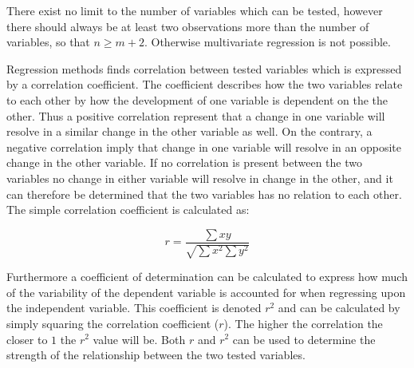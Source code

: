 There exist no limit to the number of variables which can be tested, however there should always be at least two observations more than the number of variables, so that $n \geq m+2$. Otherwise multivariate regression is not possible. \cite{zar2009}

Regression methods finds correlation between tested variables which is expressed by a correlation coefficient. The coefficient describes how the two variables relate to each other by how the development of one variable is dependent on the the other. Thus a positive correlation represent that a change in one variable will resolve in a similar change in the other variable as well. On the contrary, a negative correlation imply that change in one variable will resolve in an opposite change in the other variable. If no correlation is present between the two variables no change in either variable will resolve in change in the other, and it can therefore be determined that the two variables has no relation to each other. \cite{zar2009}
The simple correlation coefficient is calculated as: \cite{zar2009}

\begin{equation}
r = \frac{\sum xy}{\sqrt{\sum x^{2} \sum y^{2}}}
\end{equation}

Furthermore a coefficient of determination can be calculated to express how much of the variability of the dependent variable is accounted for when regressing upon the independent variable. This coefficient is denoted $r^{2}$ and can be calculated by simply squaring the correlation coefficient ($r$). The higher the correlation the closer to $1$ the $r^2$ value will be. 
Both $r$ and $r^{2}$ can be used to determine the strength of the relationship between the two tested variables. \cite{zar2009}





